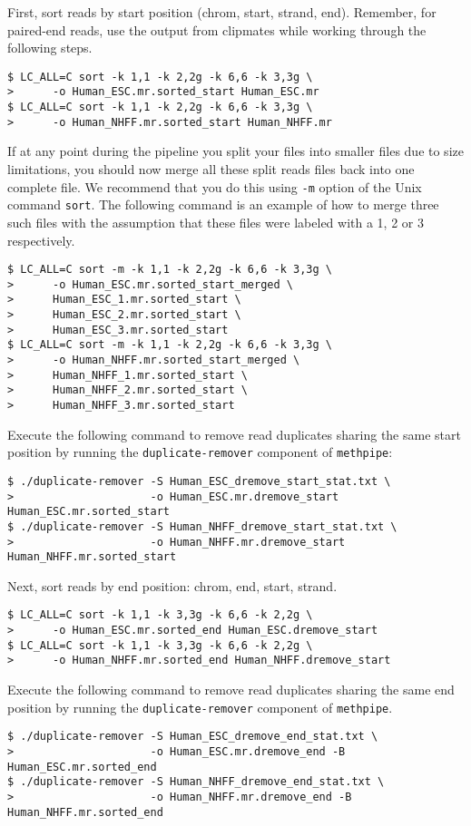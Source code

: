 \documentclass[10pt]{article}
\newcommand{\meth}{\texttt{methpipe}}
\newcommand{\prog}[1]{\texttt{#1}}
\newcommand{\op}[1]{\texttt{#1}}
\begin{document}
\begin{sloppypar}
  First, sort reads by start position (chrom, start, strand,
  end). Remember, for paired-end reads, use the output from clipmates
  while working through the following steps.
\begin{verbatim}
$ LC_ALL=C sort -k 1,1 -k 2,2g -k 6,6 -k 3,3g \
>      -o Human_ESC.mr.sorted_start Human_ESC.mr
$ LC_ALL=C sort -k 1,1 -k 2,2g -k 6,6 -k 3,3g \
>      -o Human_NHFF.mr.sorted_start Human_NHFF.mr
\end{verbatim}
  If at any point during the pipeline you split your files into
  smaller files due to size limitations, you should now merge all
  these split reads files back into one complete file. We recommend
  that you do this using \op{-m} option of the Unix command
  \prog{sort}. The following command is an example of how to merge
  three such files with the assumption that these files were labeled
  with a 1, 2 or 3 respectively.
\begin{verbatim}
$ LC_ALL=C sort -m -k 1,1 -k 2,2g -k 6,6 -k 3,3g \
>      -o Human_ESC.mr.sorted_start_merged \
>      Human_ESC_1.mr.sorted_start \
>      Human_ESC_2.mr.sorted_start \
>      Human_ESC_3.mr.sorted_start
$ LC_ALL=C sort -m -k 1,1 -k 2,2g -k 6,6 -k 3,3g \
>      -o Human_NHFF.mr.sorted_start_merged \
>      Human_NHFF_1.mr.sorted_start \
>      Human_NHFF_2.mr.sorted_start \
>      Human_NHFF_3.mr.sorted_start
\end{verbatim}
  Execute the following command to remove read duplicates sharing the
  same start position by running the \prog{duplicate-remover}
  component of \meth{}:
\begin{verbatim}
$ ./duplicate-remover -S Human_ESC_dremove_start_stat.txt \
>                     -o Human_ESC.mr.dremove_start Human_ESC.mr.sorted_start
$ ./duplicate-remover -S Human_NHFF_dremove_start_stat.txt \
>                     -o Human_NHFF.mr.dremove_start Human_NHFF.mr.sorted_start
\end{verbatim}
  Next, sort reads by end position: chrom, end, start, strand.
\begin{verbatim}
$ LC_ALL=C sort -k 1,1 -k 3,3g -k 6,6 -k 2,2g \
>      -o Human_ESC.mr.sorted_end Human_ESC.dremove_start
$ LC_ALL=C sort -k 1,1 -k 3,3g -k 6,6 -k 2,2g \
>      -o Human_NHFF.mr.sorted_end Human_NHFF.dremove_start
\end{verbatim}
  Execute the following command to remove read duplicates sharing the
  same end position by running the \prog{duplicate-remover} component
  of \meth{}.
\begin{verbatim}
$ ./duplicate-remover -S Human_ESC_dremove_end_stat.txt \
>                     -o Human_ESC.mr.dremove_end -B Human_ESC.mr.sorted_end
$ ./duplicate-remover -S Human_NHFF_dremove_end_stat.txt \
>                     -o Human_NHFF.mr.dremove_end -B Human_NHFF.mr.sorted_end
\end{verbatim}
\end{sloppypar}
\end{document}
